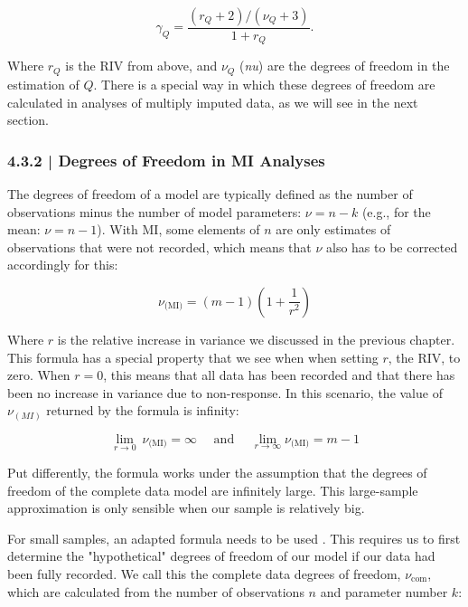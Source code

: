 \begin{equation}
\gamma_Q = \frac{(r_Q+2)/(\nu_Q+3)}{1+r_Q}.
\end{equation}

Where $r_Q$ is the RIV from above, and $\nu_Q$ (\emph{nu}) are the degrees of freedom in the estimation of $Q$. There is a special way in which these degrees of freedom are calculated in analyses of multiply imputed data, as we will see in the next section. 

\subsubsection{{\normalfont\textsf{\textcolor{sBlue}{\small 4.3.2 |}}} Degrees of Freedom in MI Analyses}

The degrees of freedom of a model are typically defined as the number of observations minus the number of model parameters: $\nu = n - k$ (e.g., for the mean: $\nu = n - 1$). With MI, some elements of $n$ are only estimates of observations that were not recorded, which means that $\nu$ also has to be corrected accordingly for this:

\begin{equation}
\nu_{\text{(MI)}} = (m-1)\left(1+ \frac{1}{r^2}\right)
\end{equation}

Where $r$ is the relative increase in variance we discussed in the previous chapter. This formula has a special property that we see when when setting $r$, the RIV, to zero. When $r=0$, this means that all data has been recorded and that there has been no increase in variance due to non-response. In this scenario, the value of $\nu_{(MI)}$ returned by the formula is infinity: 

\begin{equation}
\lim_{r \rightarrow 0}~\nu_{\text{(MI)}} = \infty~~~~~~\text{and}~~~~~~\lim_{r \rightarrow \infty} \nu_{\text{(MI)}} = m-1
\end{equation}

Put differently, the formula works under the assumption that the degrees of freedom of the complete data model are infinitely large. This large-sample approximation is only sensible when our sample is relatively big. 

For small samples, an adapted formula needs to be used \citep{barnard1999miscellanea}. This requires us to first determine the "hypothetical" degrees of freedom of our model if our data had been fully recorded. We call this the complete data degrees of freedom, $\nu_{\text{com}}$, which are calculated from the number of observations $n$ and parameter number $k$:

